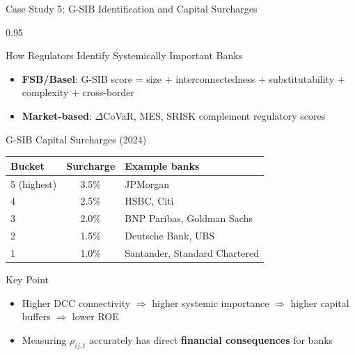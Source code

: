 \documentclass[9pt, aspectratio=169, t]{beamer}
\begin{document}
\begin{frame}{Case Study 5: G-SIB Identification and Capital Surcharges}
    \begin{cminipage}{0.95\textwidth}
    \vspace{-3mm}
    {\scriptsize
    \begin{block}{How Regulators Identify Systemically Important Banks}
        \begin{itemize}\setlength{\itemsep}{0pt}
            \item \textbf{FSB/Basel}: G-SIB score = size + interconnectedness + substitutability + complexity + cross-border
            \item \textbf{Market-based}: $\Delta$CoVaR, MES, SRISK complement regulatory scores
        \end{itemize}
    \end{block}
    \vspace{-2mm}
    \begin{block}{G-SIB Capital Surcharges (2024)}
        {\scriptsize
        \begin{center}\vspace{-2mm}
        \begin{tabular}{l|c|l}
            \hline
            \textbf{Bucket} & \textbf{Surcharge} & \textbf{Example banks} \\
            \hline
            5 (highest) & 3.5\% & JPMorgan \\
            4           & 2.5\% & HSBC, Citi \\
            3           & 2.0\% & BNP Paribas, Goldman Sachs \\
            2           & 1.5\% & Deutsche Bank, UBS \\
            1           & 1.0\% & Santander, Standard Chartered \\
            \hline
        \end{tabular}\vspace{-2mm}
        \end{center}
        }
    \end{block}
    \vspace{-3mm}
    \begin{alertblock}{Key Point}
        \begin{itemize}\setlength{\itemsep}{0pt}
            \item Higher DCC connectivity $\Rightarrow$ higher systemic importance $\Rightarrow$ higher capital buffers $\Rightarrow$ lower ROE
            \item Measuring $\rho_{ij,t}$ accurately has direct \textbf{financial consequences} for banks
        \end{itemize}
    \end{alertblock}
    }
    \end{cminipage}
\end{frame}
\end{document}
